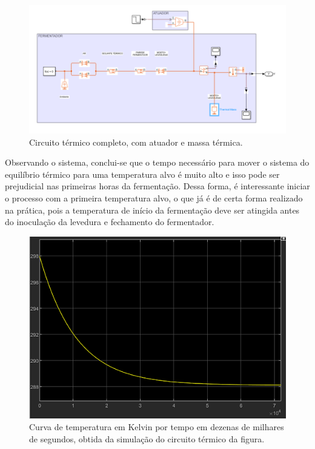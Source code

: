 \begin{figure}[H]
    \centering
    \includegraphics[scale=0.50]{figuras/projeto/controle/circ_atuador.png}
    \caption{Circuito térmico completo, com atuador e massa térmica.}
    \label{fig:circ_atuador}
\end{figure}


Observando o sistema, conclui-se que o tempo necessário para mover o sistema do equilíbrio térmico para uma temperatura alvo é muito alto e isso pode ser prejudicial nas primeiras horas da fermentação. Dessa forma, é interessante iniciar o processo com a primeira temperatura alvo, o que já é de certa forma realizado na prática, pois a temperatura de início da fermentação deve ser atingida antes do inoculação da levedura e fechamento do fermentador.


\begin{figure}[H]
    \centering
    \includegraphics[scale=0.60]{figuras/projeto/controle/curva_temp.png}
    \caption{Curva de temperatura em Kelvin por tempo em dezenas de milhares de segundos, obtida da simulação do circuito térmico da figura.}
    \label{fig:curva_temp}
\end{figure}


